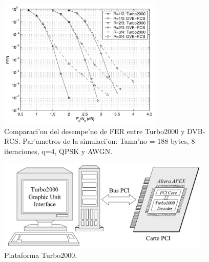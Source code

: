 \begin{figure}[H]
\centering
\includegraphics[width=0.7\textwidth]{images/figura4_2}
\caption{Comparaci'on del desempe'no de FER entre Turbo2000 y DVB-RCS. Par'ametros de la simulaci'on: Tama'no = 188 bytes, 8 iteraciones, q=4, QPSK y AWGN.}
\label{fig:4.2}
\end{figure}

\begin{figure}[H]
\centering
\includegraphics[width=0.9\textwidth]{images/figura4_3}
\caption{Plataforma Turbo2000.}
\label{fig:4.3}
\end{figure}


